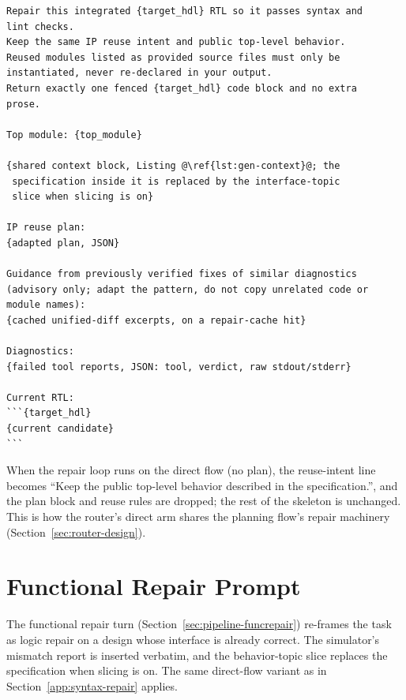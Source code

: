 \begin{lstlisting}[language={},escapechar=@,caption={Syntax repair
prompt.},label={lst:syntax-prompt}]
Repair this integrated {target_hdl} RTL so it passes syntax and
lint checks.
Keep the same IP reuse intent and public top-level behavior.
Reused modules listed as provided source files must only be
instantiated, never re-declared in your output.
Return exactly one fenced {target_hdl} code block and no extra
prose.

Top module: {top_module}

{shared context block, Listing @\ref{lst:gen-context}@; the
 specification inside it is replaced by the interface-topic
 slice when slicing is on}

IP reuse plan:
{adapted plan, JSON}

Guidance from previously verified fixes of similar diagnostics
(advisory only; adapt the pattern, do not copy unrelated code or
module names):
{cached unified-diff excerpts, on a repair-cache hit}

Diagnostics:
{failed tool reports, JSON: tool, verdict, raw stdout/stderr}

Current RTL:
```{target_hdl}
{current candidate}
```
\end{lstlisting}

When the repair loop runs on the direct flow (no plan), the
reuse-intent line becomes ``Keep the public top-level behavior
described in the specification.'', and the plan block and reuse rules
are dropped; the rest of the skeleton is unchanged. This is how the
router's direct arm shares the planning flow's repair machinery
(Section~\ref{sec:router-design}).

\section{Functional Repair Prompt}
\label{app:func-repair}

The functional repair turn (Section~\ref{sec:pipeline-funcrepair})
re-frames the task as logic repair on a design whose interface is
already correct. The simulator's mismatch report is inserted verbatim,
and the behavior-topic slice replaces the specification when slicing is
on. The same direct-flow variant as in
Section~\ref{app:syntax-repair} applies.

